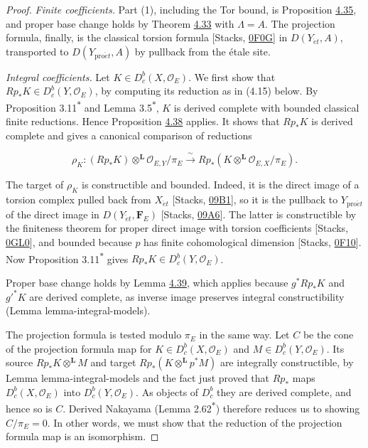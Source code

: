 \documentclass[11pt]{article}
\newcommand{\bpout}[1]{#1\textsuperscript{\hyperlink{bp-outside}{\ensuremath{\ast}}}}
\providecommand{\Dbc}{}\renewcommand{\Dbc}{D^b_c}
\begin{document}
\begin{proof}[{Proof}]\label{bp122}%
\emph{Finite coefficients.} Part (1), including the Tor bound, is Proposition \hyperref[bp106]{4.35}, and proper base change holds by Theorem \hyperref[bp98]{4.33} with \(\Lambda=A\). The projection formula, finally, is the classical torsion formula [Stacks, \href{https://stacks.math.columbia.edu/tag/0F0G}{0F0G}] in \(D(Y_{\acute{e}t},A)\), transported to \(D(Y_{\mathrm{pro}\acute{e}t},A)\) by pullback from the étale site.

\emph{Integral coefficients.} Let \(K\in\Dbc(X,\mathcal O_E)\). We first show that \(Rp_*K\in\Dbc(Y,\mathcal O_E)\), by computing its reduction as in (4.15) below. By Proposition \bpout{3.11} and Lemma \bpout{3.5}, \(K\) is derived complete with bounded classical finite reductions. Hence Proposition \hyperref[bp113]{4.38} applies. It shows that \(Rp_*K\) is derived complete and gives a canonical comparison of reductions

\[
\rho_K:(Rp_*K)\otimes^{\mathbf L}\mathcal O_{E,Y}/\pi_E
\xrightarrow{\ \sim\ } Rp_*(K\otimes^{\mathbf L}\mathcal O_{E,X}/\pi_E).
\tag{4.15}
\]

The target of \(\rho_K\) is constructible and bounded. Indeed, it is the direct image of a torsion complex pulled back from \(X_{\acute{e}t}\) [Stacks, \href{https://stacks.math.columbia.edu/tag/09B1}{09B1}], so it is the pullback to \(Y_{\mathrm{pro}\acute{e}t}\) of the direct image in \(D(Y_{\acute{e}t},\mathbf F_E)\) [Stacks, \href{https://stacks.math.columbia.edu/tag/09A6}{09A6}]. The latter is constructible by the finiteness theorem for proper direct image with torsion coefficients [Stacks, \href{https://stacks.math.columbia.edu/tag/0GL0}{0GL0}], and bounded because \(p\) has finite cohomological dimension [Stacks, \href{https://stacks.math.columbia.edu/tag/0F10}{0F10}]. Now Proposition \bpout{3.11} gives \(Rp_*K\in\Dbc(Y,\mathcal O_E)\).

Proper base change holds by Lemma \hyperref[bp116]{4.39}, which applies because \(g^*Rp_*K\) and \(g'^*K\) are derived complete, as inverse image preserves integral constructibility (Lemma lemma-integral-models).

The projection formula is tested modulo \(\pi_E\) in the same way. Let \(C\) be the cone of the projection formula map for \(K\in\Dbc(X,\mathcal O_E)\) and \(M\in\Dbc(Y,\mathcal O_E)\). Its source \(Rp_*K\otimes^{\mathbf L}M\) and target \(Rp_*(K\otimes^{\mathbf L}p^*M)\) are integrally constructible, by Lemma lemma-integral-models and the fact just proved that \(Rp_*\) maps \(\Dbc(X,\mathcal O_E)\) into \(\Dbc(Y,\mathcal O_E)\). As objects of \(\Dbc\) they are derived complete, and hence so is \(C\). Derived Nakayama (Lemma \bpout{2.62}) therefore reduces us to showing \(C/\pi_E=0\). In other words, we must show that the reduction of the projection formula map is an isomorphism.


\end{proof}
\end{document}
